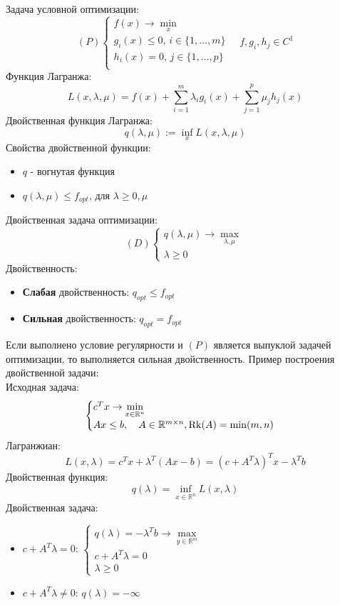 Задача условной оптимизации:
\[
    (P)
    \begin{cases}
        f(x) \to \min\limits_{x} \\
        g_{i}(x) \leq 0, \, i \in \{ 1, \dots , m \} \\
        h_{i}(x) = 0, \, j \in \{ 1, \dots , p \} \\
    \end{cases}
    \quad f, g_{i}, h_{j} \in C^{1}
\]
Функция Лагранжа:
\[
    L(x, \lambda, \mu) = f(x) + \sum\limits_{i=1}^{m} \lambda_{i} g_{i}(x) + \sum\limits_{j=1}^{p} \mu_{j} h_{j}(x)
\]
Двойственная функция Лагранжа:
\[
    q(\lambda, \mu) := \inf\limits_{x} L(x, \lambda, \mu)
\]
Свойства двойственной функции:
\begin{itemize}
    \item $q$ - вогнутая функция
    \item $q(\lambda, \mu) \leq f_{opt}$, для $\lambda \geq 0, \mu$
\end{itemize}
Двойственная задача оптимизации:
\[
    (D)
    \begin{cases}
        q(\lambda, \mu) \to \max\limits_{\lambda, \mu} \\
        \lambda \geq 0
    \end{cases}
\]
Двойственность:
\begin{itemize}
    \item \textbf{Слабая} двойственность: $q_{opt} \leq f_{opt}$
    \item \textbf{Сильная} двойственность: $q_{opt} = f_{opt}$
\end{itemize}
Если выполнено условие регулярности и $(P)$ является выпуклой задачей оптимизации, то выполняется сильная двойственность.
Пример построения двойственной задачи: \\
Исходная задача:
\[
    \begin{cases}
        c^{T} x \to \min\limits_{x \in \mathbb{R}^{n}} \\
        Ax \leq b, \quad A \in \mathbb{R}^{m \times n}, \operatorname{Rk}(A) = \min(m, n)
    \end{cases}
\]
Лагранжиан:
\[
    L(x, \lambda) = c^{T} x + \lambda^{T} (Ax - b) = (c + A^{T}\lambda)^{T} x - \lambda^{T} b
\]
Двойственная функция:
\[
    q(\lambda) = \inf\limits_{x \in \mathbb{R}^{n}} L(x, \lambda)
\]
Двойственная задача:
\begin{itemize}
    \item $c + A^{T}\lambda = 0$: \quad $\begin{cases}
                                             q(\lambda) = -\lambda^{T}b \to \max\limits_{y \in \mathbb{R}^{m}} \\ c + A^{T}\lambda = 0 \\ \lambda \geq 0
    \end{cases}$
    \item $c + A^{T}\lambda \neq 0$: $q(\lambda) = -\infty$
\end{itemize}
